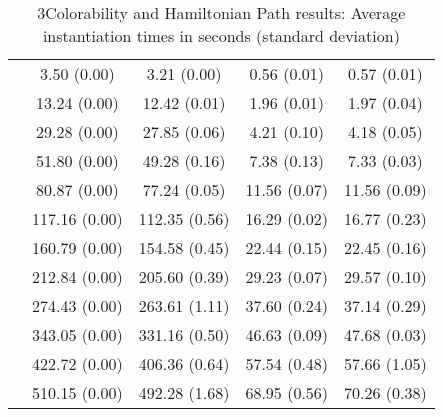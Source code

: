 \documentclass[preprint]{tlp}
\begin{document}
\begin{table}[b!]
{\begin{tabular}{| c | c | c | c | c |}
 & 3.50 (0.00) & 3.21 (0.00) & 0.56 (0.01) & 0.57 (0.01) \\ 
 & 13.24 (0.00) & 12.42 (0.01) & 1.96 (0.01) & 1.97 (0.04) \\ 
 & 29.28 (0.00) & 27.85 (0.06) & 4.21 (0.10) & 4.18 (0.05) \\ 
 & 51.80 (0.00) & 49.28 (0.16) & 7.38 (0.13) & 7.33 (0.03) \\ 
 & 80.87 (0.00) & 77.24 (0.05) & 11.56 (0.07) & 11.56 (0.09) \\ 
 & 117.16 (0.00) & 112.35 (0.56) & 16.29 (0.02) & 16.77 (0.23) \\ 
 & 160.79 (0.00) & 154.58 (0.45) & 22.44 (0.15) & 22.45 (0.16) \\ 
 & 212.84 (0.00) & 205.60 (0.39) & 29.23 (0.07) & 29.57 (0.10) \\ 
 & 274.43 (0.00) & 263.61 (1.11) & 37.60 (0.24) & 37.14 (0.29) \\ 
 & 343.05 (0.00) & 331.16 (0.50) & 46.63 (0.09) & 47.68 (0.03) \\ 
 & 422.72 (0.00) & 406.36 (0.64) & 57.54 (0.48) & 57.66 (1.05) \\ 
 & 510.15 (0.00) & 492.28 (1.68) & 68.95 (0.56) & 70.26 (0.38) \\
\cline{1-5}
\end{tabular}
\caption{3Colorability and Hamiltonian Path results: Average instantiation times in seconds (standard deviation) }
\label{tab_1}
}
\end{table}
\end{document}
